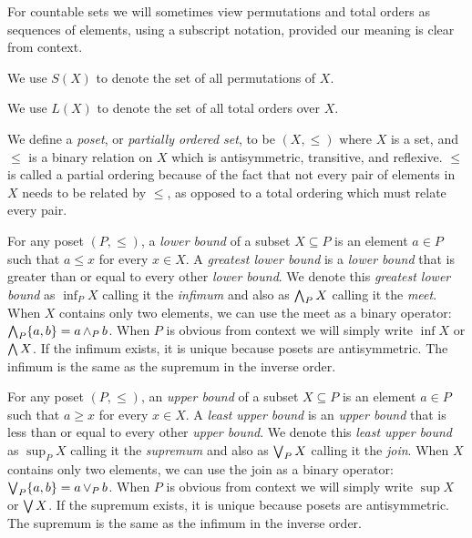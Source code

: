 	For countable sets we will sometimes view permutations and total orders as sequences of elements, using a subscript notation, provided our meaning is clear from context.

	\begin{definition}
		We use $S(X)$ to denote the set of all permutations of $X$.
	\end{definition}

	\begin{definition}
		We use $L(X)$ to denote the set of all total orders over $X$.
	\end{definition}

	\begin{definition}
		We define a \emph{poset}, or \emph{partially ordered set}, to be $(X, \le)$ where $X$ is a set, and $\le$ is a binary relation on $X$ which is antisymmetric, transitive, and reflexive. $\le$ is called a partial ordering because of the fact that not every pair of elements in $X$ needs to be related by $\le$, as opposed to a total ordering which must relate every pair.
	\end{definition}

	\begin{definition}
		For any poset $(P, \le)$, a \emph{lower bound} of a subset $X \subseteq P$ is an element $a \in P$ such that $a \le x$ for every $x \in X$. A \emph{greatest lower bound} is a \emph{lower bound} that is greater than or equal to every other \emph{lower bound}. We denote this \emph{greatest lower bound} as $\inf_P X$ calling it the \emph{infimum} \cite{birkhoﬀ1967lattice} and also as $\operatorname{\bigwedge}_P X$ calling it the \emph{meet}. When $X$ contains only two elements, we can use the meet as a binary operator: $\operatorname{\bigwedge}_P \{a, b\} = a \operatorname{\wedge}_P b$. When $P$ is obvious from context we will simply write $\inf X$ or $\operatorname{\bigwedge} X$. If the infimum exists, it is unique because posets are antisymmetric. The infimum is the same as the supremum in the inverse order.
	\end{definition}

	\begin{definition}
		For any poset $(P, \le)$, an \emph{upper bound} of a subset $X \subseteq P$ is an element $a \in P$ such that $a \ge x$ for every $x \in X$. A \emph{least upper bound} is an \emph{upper bound} that is less than or equal to every other \emph{upper bound}. We denote this \emph{least upper bound} as $\sup_P X$ calling it the \emph{supremum} \cite{birkhoﬀ1967lattice} and also as $\operatorname{\bigvee}_P X$ calling it the \emph{join}. When $X$ contains only two elements, we can use the join as a binary operator: $\operatorname{\bigvee}_P \{a, b\} = a \operatorname{\vee}_P b$. When $P$ is obvious from context we will simply write $\sup X$ or $\operatorname{\bigvee} X$. If the supremum exists, it is unique because posets are antisymmetric. The supremum is the same as the infimum in the inverse order.
	\end{definition}

